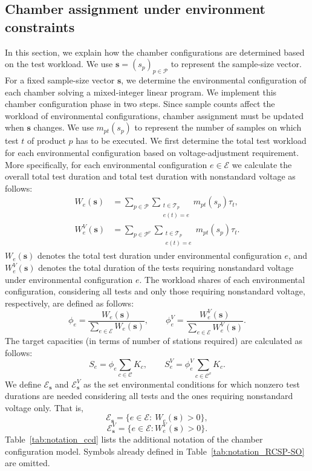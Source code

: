 \subsection{Chamber assignment under environment constraints}
\label{subsec:chamber_assignment}

In this section, we explain how the chamber configurations are determined based on the test workload. We use \(\mathbf{s}=(s_p)_{p\in\mathcal{P}}\) to represent the sample-size vector. For a fixed sample-size vector \(\mathbf{s}\), we determine the environmental configuration of each chamber solving a mixed-integer linear program. We implement this chamber configuration phase in two steps. Since sample counts affect the workload of environmental configurations, chamber assignment must be updated when \(\mathbf{s}\) changes. We use \(m_{pt}(s_p)\) to represent the number of samples on which test \(t\) of product \(p\) has to be executed. We first determine the total test workload for each environmental configuration based on voltage-adjustment requirement. More specifically, for each environmental configuration \(e \in \mathcal{E}\) we calculate the overall total test duration and total test duration with nonstandard voltage as follows:
\begin{align*}
W_e(\mathbf{s}) &=
\sum_{p\in\mathcal{P}}
\sum_{\substack{t\in\mathcal{T}_p\\e(t)=e}}
m_{pt}(s_p)\tau_t,
\\
W_e^V(\mathbf{s}) &=
\sum_{p\in\mathcal{P}^v}
\sum_{\substack{t\in\mathcal{T}_p\\e(t)=e}}
m_{pt}(s_p)\tau_t.
\end{align*}
\(W_e(\mathbf{s})\) denotes the total test duration under environmental configuration \(e\), and \(W_e^V(\mathbf{s})\) denotes the total duration of the tests requiring nonstandard voltage under environmental configuration \(e\). The workload shares of each environmental configuration, considering all tests and only those requiring nonstandard voltage, respectively, are defined as follows:
\[
\phi_e=\frac{W_e(\mathbf{s})}{\sum\limits_{e\in\mathcal{E}}W_e(\mathbf{s})},\qquad
\phi_e^V=\frac{W_e^V(\mathbf{s})}{\sum\limits_{e\in\mathcal{E}}W_e^V(\mathbf{s})}.
\]
The target capacities (in terms of number of stations required) are calculated as follows:
\[
S_e=\phi_e \sum_{c\in\mathcal{C}}K_c,\qquad
S_e^V=\phi_e^V \sum_{c\in\mathcal{C}^v}K_c.
\]
We define \(\mathcal{E}_\mathbf{s}\) and \(\mathcal{E}^V_\mathbf{s}\) as the set environmental conditions for which nonzero test durations are needed considering all tests and the ones requiring nonstandard voltage only. That is,
\[
\mathcal{E}_\mathbf{s}=\{e\in\mathcal{E}:\ W_e(\mathbf{s})>0\},
\]
\[
\mathcal{E}^V_\mathbf{s}=\{e\in\mathcal{E}:W_e^V(\mathbf{s})>0\}.
\]
Table~\ref{tab:notation_ccd} lists the additional notation of the chamber configuration model. Symbols already defined in Table~\ref{tab:notation_RCSP-SO} are omitted.

